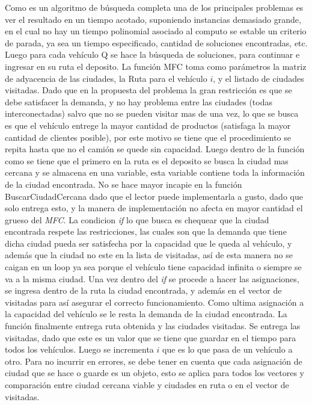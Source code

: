 \documentclass[letter, 10pt]{article}
\begin{document}
Como es un algoritmo de b\'usqueda completa una de los principales problemas es ver el resultado en un tiempo acotado, suponiendo instancias demasiado grande, en el cual no hay un tiempo polinomial asociado 
al computo se estable un criterio de parada, ya sea un tiempo especificado, cantidad de soluciones encontradas, etc.
\newline
Luego para cada veh\'iculo Q se hace la b\'usqueda de soluciones, para continuar e ingresar en su ruta el deposito.
La funci\'on MFC toma como par\'ametros la matriz de adyacencia de las ciudades, la Ruta para el veh\'iculo $i$, y el listado de ciudades visitadas. Dado que en la propuesta del problema la gran restricci\'on
es que se debe satisfacer la demanda, y no hay problema entre las ciudades (todas interconectadas) salvo que no se pueden visitar mas de una vez, lo que se busca es que el veh\'iculo entrege la mayor cantidad
de productos (satisfaga la mayor cantidad de clientes posible), por este motivo se tiene que el procedimiento se repita hasta que no el cami\'on se quede sin capacidad.
\newline
Luego dentro de la funci\'on como se tiene que el primero en la ruta es el deposito se busca la ciudad mas cercana y se almacena en una variable, esta variable contiene toda la informaci\'on de la ciudad 
encontrada. No se hace mayor incapie en la funci\'on BuscarCiudadCercana dado que el lector puede implementarla a gusto, dado que solo entrega esto, y la manera de implementaci\'on no afecta en mayor cantidad 
el grueso del \emph{MFC}.
\newline
La condicion \emph{if} lo que busca es chequear que la ciudad encontrada respete las restricciones, las cuales son que la demanda que tiene dicha ciudad pueda ser satisfecha por la capacidad que le queda al
veh\'iculo, y adem\'as que la ciudad no este en la lista de visitadas, as\'i de esta manera no se caigan en un loop ya sea porque el veh\'iculo tiene capacidad infinita o siempre se va a la misma ciudad.
\newline
Una vez dentro del \emph{if} se procede a hacer las asignaciones, se ingresa dentro de la ruta la ciudad encontrada, y adem\'as en el vector de visitadas para as\'i asegurar el correcto funcionamiento. 
Como ultima asignaci\'on a la capacidad del veh\'iculo se le resta la demanda de la ciudad encontrada.
\newline
La funci\'on finalmente entrega ruta obtenida y las ciudades visitadas. Se entrega las visitadas, dado que este es un valor que se tiene que guardar en el tiempo para todos los veh\'iculos. Luego se incrementa 
$i$ que es lo que pasa de un veh\'iculo a otro.
\newline
Para no incurrir en errores, se debe tener en cuenta que cada asignaci\'on de ciudad que se hace o guarde es un objeto, esto se aplica para todos los vectores y comparaci\'on entre ciudad cercana viable y
ciudades en ruta o en el vector de visitadas.
\end{document}
